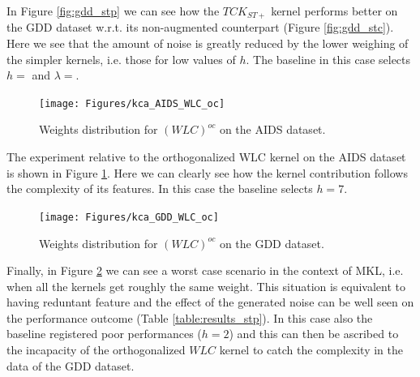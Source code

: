 In Figure \ref{fig:gdd_stp} we can see how the $TCK_{ST+}$ kernel performs better
on the GDD dataset w.r.t. its non-augmented counterpart (Figure \ref{fig:gdd_stc}).
Here we see that the amount of noise is greatly reduced by the lower weighing of the
simpler kernels, i.e. those for low values of $h$.
The baseline in this case selects $h=$ and $\lambda=$.

\begin{figure}[ht]
    \centering
    \texttt{[image: Figures/kca\_AIDS\_WLC\_oc]}
    \caption{\footnotesize Weights distribution for $(WLC)^{oc}$ on the AIDS dataset.}
    \label{fig:aids_wlc}
\end{figure}

The experiment relative to the orthogonalized WLC kernel on the AIDS dataset
is shown in Figure \ref{fig:aids_wlc}.
Here we can clearly see how the kernel contribution follows the complexity of its
features.
In this case the baseline selects $h=7$.

\begin{figure}[ht]
    \centering
    \texttt{[image: Figures/kca\_GDD\_WLC\_oc]}
    \caption{\footnotesize Weights distribution for $(WLC)^{oc}$ on the GDD dataset.}
    \label{fig:gdd_wlc}
\end{figure}
 
Finally, in Figure \ref{fig:gdd_wlc} we can see a worst case scenario in the context of 
MKL, i.e. when all the kernels get roughly the same weight.
This situation is equivalent to having reduntant feature and
the effect of the generated noise can be well seen on the performance outcome (Table \ref{table:results_stp}).
In this case also the baseline registered poor performances ($h=2$) and this can then
be ascribed to the incapacity of the orthogonalized $WLC$ kernel to catch the complexity
in the data of the GDD dataset.

